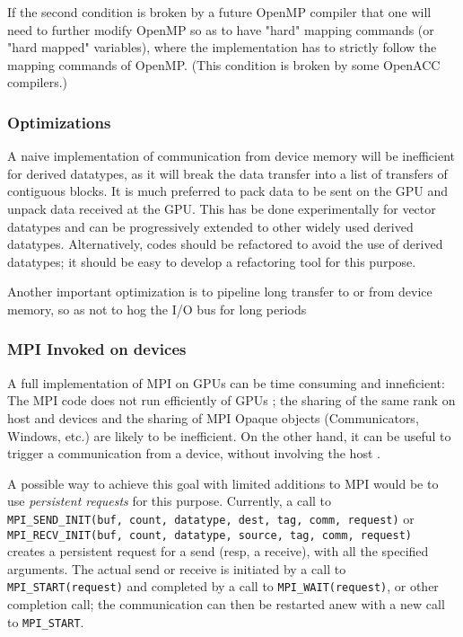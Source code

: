 If the second condition is broken by a future OpenMP compiler that one will 
need to further modify OpenMP so as to have "hard" mapping commands (or "hard 
mapped" variables), where the implementation has to strictly follow the 
mapping commands of OpenMP. (This condition is broken by some OpenACC 
compilers.)

\subsubsection{Optimizations}
A naive implementation of communication from device memory will be inefficient 
for derived datatypes, as it will break the data transfer into a list of 
transfers of contiguous blocks. It is much preferred to pack data to be sent 
on the GPU and unpack data   received at the GPU. This has be done 
experimentally for vector datatypes \cite{wang2014gpu} and can be progressively 
extended to other widely used derived datatypes. Alternatively, codes should be 
refactored to avoid the use of derived datatypes; it should be easy to develop 
a refactoring tool for this purpose.

Another important optimization is to pipeline long transfer to or from device 
memory, so as not to hog the I/O bus for long periods \cite{aji2016mpi}

\subsubsection{MPI Invoked on devices}

A full implementation of MPI on GPUs can be time consuming and inneficient:
The MPI code does not run efficiently of GPUs \cite{Klenk2017}; the sharing of 
the same rank on host and devices and the sharing of MPI Opaque objects 
(Communicators, Windows, etc.) are likely to be inefficient. On the other hand, 
it can be useful to trigger a communication from a device, without involving 
the host \cite{oden2016analyzing}.

A possible way to achieve this goal with limited additions to MPI would be to 
use \emph{persistent requests} for this purpose. Currently, a call to 
\\
\texttt{MPI\_SEND\_INIT(buf, count, datatype, dest, tag, comm, request)} or\\
\texttt{MPI\_RECV\_INIT(buf, count, datatype, source, tag, comm, request)}\\
creates a persistent request for a send (resp, a receive), with all the 
specified arguments. The actual send or receive is initiated by a call to 
\texttt{MPI\_START(request)} and completed by a call to 
\texttt{MPI\_WAIT(request)}, or other completion call; the communication can 
then be restarted anew with a new call to \texttt{MPI\_START}.

